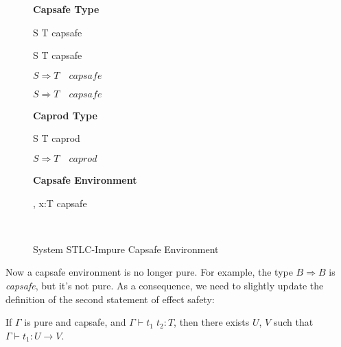 \begin{figure}[h]
\begin{framed}

\setlength{\columnseprule}{0.4pt}
\begin{multicols}{2}

\textbf{Capsafe Type}


{ S \to T \quad capsafe }

{ S \to T \quad capsafe }

{ \colorbox{shade}{$S \Rightarrow T \quad capsafe$} }

{ \colorbox{shade}{$S \Rightarrow T \quad capsafe$} }

\columnbreak

\textbf{Caprod Type}


{ S \to T \quad caprod }

{ \colorbox{shade}{$S \Rightarrow T \quad caprod$} }

\textbf{Capsafe Environment}


{ \Gamma, \; x:T \quad capsafe }

\hfill\\

\end{multicols}
\end{framed}

\caption{System STLC-Impure Capsafe Environment}
\label{fig:stlc-impure-capsafe-definition}
\end{figure}

Now a capsafe environment is no longer pure. For example, the type
$B \Rightarrow B$ is \emph{capsafe}, but it's not pure. As a
consequence, we need to slightly update the definition of the second
statement of effect safety:

\begin{definition}
  If $\Gamma$ is pure and capsafe, and $\Gamma \vdash t_1 \; t_2 : T$,
  then there exists $U$, $V$ such that $\Gamma \vdash t_1 : U \to V$.
\end{definition}

